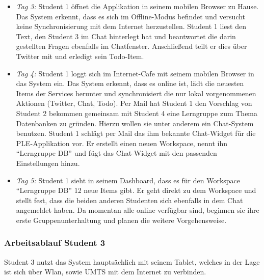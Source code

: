 \begin{itemize}
 \item \emph{Tag 3:} Student 1 öffnet die Applikation in seinem mobilen Browser zu Hause. Das System erkennt, dass es sich im Offline-Modus befindet und versucht keine Synchronisierung mit dem Internet herzustellen. Student 1 liest den Text, den Student 3 im Chat hinterlegt hat und beantwortet die darin gestellten Fragen ebenfalls im Chatfenster. Anschließend teilt er dies über Twitter mit und erledigt sein Todo-Item.
 \item \emph{Tag 4:} Student 1 loggt sich im Internet-Cafe mit seinem mobilen Browser in das System ein. Das System erkennt, dass es online ist, lädt die neuesten Items der Services herunter und synchronisiert die nur lokal vorgenommenen Aktionen (Twitter, Chat, Todo). Per Mail hat Student 1 den Vorschlag von Student 2 bekommen gemeinsam mit Student 4 eine Lerngruppe zum Thema Datenbanken zu gründen. Hierzu wollen sie unter anderem ein Chat-System benutzen. Student 1 schlägt per Mail das ihm bekannte Chat-Widget für die PLE-Applikation vor. Er erstellt einen neuen Workspace, nennt ihn “Lerngruppe DB” und fügt das Chat-Widget mit den passenden Einstellungen hinzu.
 \item \emph{Tag 5:} Student 1 sieht in seinem Dashboard, dass es für den Workspace “Lerngruppe DB” 12 neue Items gibt. Er geht direkt zu dem Workspace und stellt fest, dass die beiden anderen Studenten sich ebenfalls in dem Chat angemeldet haben. Da momentan alle online verfügbar sind, beginnen sie ihre erste Gruppenunterhaltung und planen die weitere Vorgehensweise.
\end{itemize}

\subsubsection{Arbeitsablauf Student 3}
Student 3 nutzt das System hauptsächlich mit seinem Tablet, welches in der Lage ist sich über Wlan, sowie UMTS mit dem Internet zu verbinden.


